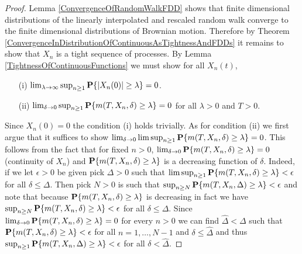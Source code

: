 \begin{proof}
Lemma \ref{ConvergenceOfRandomWalkFDD} shows that finite dimensional
distributions of the linearly interpolated and rescaled random walk
converge to the finite dimensional distributions of Brownian motion.
Therefore by Theorem
\ref{ConvergenceInDistributionOfContinuousAsTightnessAndFDDs} it
remains to show that $X_n$ is a tight sequence of processes.
By Lemma \ref{TightnessOfContinuousFunctions} we must show for all $X_n(t)$,
\begin{itemize}
\item[(i)]$\lim_{\lambda \to \infty} \sup_{n \geq 1} \textbf{P}\{\left \vert X_n(0) \right \vert
  \geq \lambda\}= 0$.
\item[(ii)] $\lim_{\delta \to 0} \sup_{n \geq 1} \textbf{P}\{m(T, X_n,
  \delta) \geq \lambda\} = 0$ for all $\lambda > 0$ and $T > 0$.
\end{itemize}
Since $X_n(0) = 0$ the condition (i) holds trivially.  As for
condition (ii) we first argue that it suffices to show $\lim_{\delta \to 0} \limsup_{n \geq 1} \textbf{P}\{m(T, X_n,
  \delta) \geq \lambda\}= 0$.  This follows from the fact that for
fixed $n > 0$,
$\lim_{\delta \to 0} \textbf{P}\{m(T, X_n,  \delta) \geq \lambda\} =
0$ (continuity of $X_n$) and $\textbf{P}\{m(T, X_n,  \delta) \geq \lambda\}$ is a decreasing
function of $\delta$.  Indeed, if we let $\epsilon > 0$ be given pick
$\Delta > 0$ such that $\limsup_{n \geq 1} \textbf{P}\{m(T, X_n,
  \delta) \geq \lambda\} < \epsilon$ for all $\delta \leq \Delta$.  Then pick $N > 0$ is such that $\sup_{n \geq N} \textbf{P}\{m(T, X_n,
  \Delta) \geq \lambda\} < \epsilon$ and note that because $\textbf{P}\{m(T, X_n,
  \delta) \geq \lambda\}$ is decreasing in fact we have $\sup_{n \geq N} \textbf{P}\{m(T, X_n,
  \delta) \geq \lambda\} < \epsilon$ for all $\delta \leq \Delta$.
Since $\lim_{\delta \to 0} \textbf{P}\{m(T, X_n,
  \delta) \geq \lambda\} = 0 $ for every $n>0$ we can find
$\hat{\Delta} < \Delta$ such that $\textbf{P}\{m(T, X_n,
  \delta) \geq \lambda\}  < \epsilon$ for all $n=1, \dotsc, N-1$ and
$\delta \leq \hat{\Delta}$ and
thus $\sup_{n \geq 1} \textbf{P}\{m(T, X_n,  \Delta) \geq \lambda\} < \epsilon$ for all $\delta < \hat{\Delta}$.


\end{proof}
